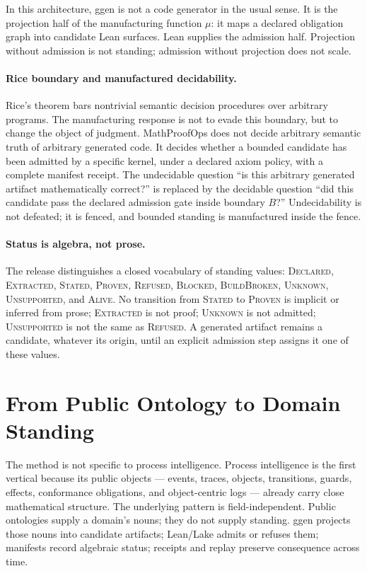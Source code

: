 \documentclass[11pt]{article}
\begin{document}
In this architecture, \textsf{ggen} is not a code generator in the usual
sense. It is the projection half of the manufacturing function \(\mu\):
it maps a declared obligation graph into candidate Lean surfaces. Lean
supplies the admission half. Projection without admission is not
standing; admission without projection does not scale.

\paragraph{Rice boundary and manufactured decidability.}
Rice's theorem bars nontrivial semantic decision procedures over
arbitrary programs. The manufacturing response is not to evade this
boundary, but to change the object of judgment. MathProofOps does not
decide arbitrary semantic truth of arbitrary generated code. It decides
whether a bounded candidate has been admitted by a specific kernel, under
a declared axiom policy, with a complete manifest receipt. The
undecidable question ``is this arbitrary generated artifact
mathematically correct?'' is replaced by the decidable question ``did
this candidate pass the declared admission gate inside boundary \(B\)?''
Undecidability is not defeated; it is fenced, and bounded standing is
manufactured inside the fence.

\paragraph{Status is algebra, not prose.}
The release distinguishes a closed vocabulary of standing values:
\textsc{Declared}, \textsc{Extracted}, \textsc{Stated}, \textsc{Proven},
\textsc{Refused}, \textsc{Blocked}, \textsc{BuildBroken}, \textsc{Unknown},
\textsc{Unsupported}, and \textsc{Alive}. No transition from
\textsc{Stated} to \textsc{Proven} is implicit or inferred from prose;
\textsc{Extracted} is not proof; \textsc{Unknown} is not admitted;
\textsc{Unsupported} is not the same as \textsc{Refused}. A generated
artifact remains a candidate, whatever its origin, until an explicit
admission step assigns it one of these values.

\section{From Public Ontology to Domain Standing}
\label{sec:ontology-generalization}

The method is not specific to process intelligence. Process intelligence
is the first vertical because its public objects --- events, traces,
objects, transitions, guards, effects, conformance obligations, and
object-centric logs --- already carry close mathematical structure. The
underlying pattern is field-independent. Public ontologies supply a
domain's nouns; they do not supply standing. \textsf{ggen} projects those
nouns into candidate artifacts; Lean/Lake admits or refuses them;
manifests record algebraic status; receipts and replay preserve
consequence across time.
\end{document}
